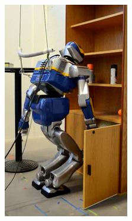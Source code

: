 \begin{figure}
\begin{subfigure}{0.19\columnwidth}
    \includegraphics[width = \columnwidth]
                    {src/chap3-optimal-motion-planning/figure/shelves-6.png}
    \label{shelves-6}
  \end{subfigure}
  \begin{subfigure}{0.19\columnwidth}
    \centering

\end{subfigure}
\end{figure}
